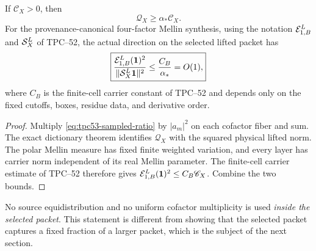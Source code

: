 \begin{corollary}
\label{cor:tpc53-interior-bridge}
If \(\mathscr C_X>0\), then
\begin{equation}
 \mathscr Q_X\ge\alpha_*\mathscr C_X.
 \label{eq:tpc53-aggregate-overlap}
\end{equation}
For the provenance-canonical four-factor Mellin synthesis, using the
notation \(\mathcal E_{1,B}^{L}\) and \(\mathcal S_X^{L}\) of TPC--52, the actual
direction on the selected lifted packet has
\begin{equation}
 \boxed{
 \frac{\mathcal E_{1,B}^{L}(\mathbf 1)^2}{\|\mathcal S_X^{L}\mathbf 1\|^2}
 \le\frac{C_B}{\alpha_*}=O(1),}
 \label{eq:tpc53-condition-number}
\end{equation}
where \(C_B\) is the finite-cell carrier constant of TPC--52 and depends
only on the fixed cutoffs, boxes, residue data, and derivative order.
\end{corollary}

\begin{proof}
Multiply \eqref{eq:tpc53-sampled-ratio} by \(|a_m|^2\) on each
cofactor fiber and sum.  The exact dictionary theorem identifies
\(\mathscr Q_X\) with the squared physical lifted norm.  The polar
Mellin measure has fixed finite weighted variation, and every layer has
carrier norm independent of its real Mellin parameter.  The finite-cell
carrier estimate of TPC--52 therefore gives
\(\mathcal E_{1,B}^{L}(\mathbf 1)^2\le C_B\mathscr C_X\).  Combine the two bounds.
\end{proof}

No source equidistribution and no uniform cofactor multiplicity is used
\emph{inside the selected packet}.  This statement is different from
showing that the selected packet captures a fixed fraction of a larger
packet, which is the subject of the next section.

